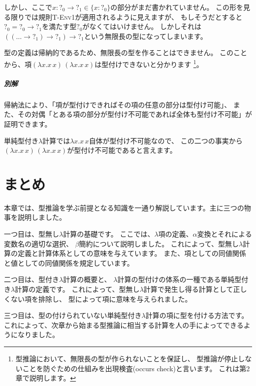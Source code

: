 \begin{exercise}
しかし、ここで$x : ?_0 \to ?_1 \in \{x : ?_0\}$の部分がまだ書かれていません。
この形を見る限りでは規則\textsc{T-Env1}が適用されるように見えますが、
もしそうだとすると$?_0 = ?_0 \to ?_1$を満たす型$?_0$がなくてはいけません。
しかしそれは$((\dots \to ?_1) \to ?_1) \to ?_1$という無限長の型になってしまいます。

型の定義は帰納的であるため、無限長の型を作ることはできません。
このことから、項$(\lambda x . x \, x) \, (\lambda x . x \, x)$は型付けできないと分かります
\footnote{型推論において、無限長の型が作られないことを保証し、
型推論が停止しないことを防ぐための仕組みを出現検査(occurs check)と言います。
これは第2章で説明します。}。

\subparagraph{別解}

帰納法により、「項が型付けできればその項の任意の部分は型付け可能」、
また、その対偶「とある項の部分が型付け不可能であれば全体も型付け不可能」が証明できます。

単純型付き$\lambda$計算では$\lambda x . x \, x$自体が型付け不可能なので、
この二つの事実から$(\lambda x . x \, x) \, (\lambda x . x \, x)$が型付け不可能であると言えます。

\end{exercise}

\section{まとめ}

本章では、型推論を学ぶ前提となる知識を一通り解説しています。主に三つの物事を説明しました。

一つ目は、型無し$\lambda$計算の基礎です。
ここでは、$\lambda$項の定義、$\alpha$変換とそれによる変数名の適切な選択、
$\beta$簡約について説明しました。
これによって、型無し$\lambda$計算の定義と計算体系としての意味を与えています。
また、項としての同値関係と値としての同値関係を規定しています。

二つ目は、型付き$\lambda$計算の概要と、
$\lambda$計算の型付けの体系の一種である単純型付き$\lambda$計算の定義です。
これによって、型無し$\lambda$計算で発生し得る計算として正しくない項を排除し、
型によって項に意味を与えられました。

三つ目は、型の付けられていない単純型付き$\lambda$計算の項に型を付ける方法です。
これによって、次章から始まる型推論に相当する計算を人の手によってできるようになりました。

